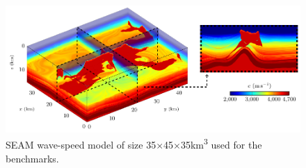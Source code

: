 %

\begin{figure}\centering
\includegraphics[scale=0.65]{graphics/hawen/skeleton_3D_seam}
\caption{SEAM wave-speed model of size \num{35}$\times$\num{45}$\times$\num{35}\si{\km\cubed} 
         used for the benchmarks.}
\label{figure:hawen:seam-model}
\end{figure}



